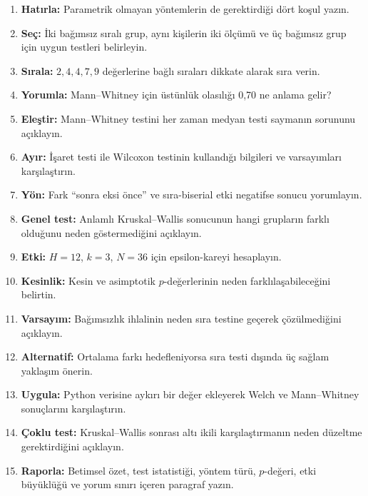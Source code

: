 \begin{enumerate}
\renewcommand{\labelenumi}{\textbf{\Alph{enumi}.}}
  \item \textbf{Hatırla:} Parametrik olmayan yöntemlerin de gerektirdiği dört koşul yazın.
  \item \textbf{Seç:} İki bağımsız sıralı grup, aynı kişilerin iki ölçümü ve üç bağımsız grup için uygun testleri belirleyin.
  \item \textbf{Sırala:} $2,4,4,7,9$ değerlerine bağlı sıraları dikkate alarak sıra verin.
  \item \textbf{Yorumla:} Mann--Whitney için üstünlük olasılığı 0,70 ne anlama gelir?
  \item \textbf{Eleştir:} Mann--Whitney testini her zaman medyan testi saymanın sorununu açıklayın.
  \item \textbf{Ayır:} İşaret testi ile Wilcoxon testinin kullandığı bilgileri ve varsayımları karşılaştırın.
  \item \textbf{Yön:} Fark ``sonra eksi önce'' ve sıra-biserial etki negatifse sonucu yorumlayın.
  \item \textbf{Genel test:} Anlamlı Kruskal--Wallis sonucunun hangi grupların farklı olduğunu neden göstermediğini açıklayın.
  \item \textbf{Etki:} $H=12$, $k=3$, $N=36$ için epsilon-kareyi hesaplayın.
  \item \textbf{Kesinlik:} Kesin ve asimptotik $p$-değerlerinin neden farklılaşabileceğini belirtin.
  \item \textbf{Varsayım:} Bağımsızlık ihlalinin neden sıra testine geçerek çözülmediğini açıklayın.
  \item \textbf{Alternatif:} Ortalama farkı hedefleniyorsa sıra testi dışında üç sağlam yaklaşım önerin.
  \item \textbf{Uygula:} Python verisine aykırı bir değer ekleyerek Welch ve Mann--Whitney sonuçlarını karşılaştırın.
  \item \textbf{Çoklu test:} Kruskal--Wallis sonrası altı ikili karşılaştırmanın neden düzeltme gerektirdiğini açıklayın.
  \item \textbf{Raporla:} Betimsel özet, test istatistiği, yöntem türü, $p$-değeri, etki büyüklüğü ve yorum sınırı içeren paragraf yazın.
\end{enumerate}

